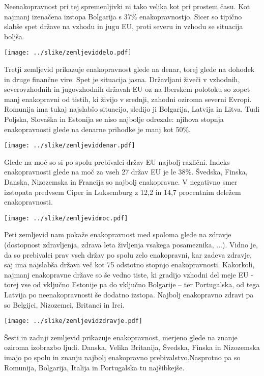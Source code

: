 \documentclass[11pt,a4paper]{article}
\begin{document}
Neenakopravnost pri tej spremenljivki ni tako velika kot pri prostem času. Kot najmanj izenačena izstopa Bolgarija s 37\% enakopravnostjo. Sicer so tipično slabše spet države na vzhodu in jugu EU, proti severu in vzhodu se situacija boljša.

\texttt{[image: ../slike/zemljeviddelo.pdf]}

\newpage

Tretji zemljevid prikazuje enakopravnost glede na denar, torej glede na dohodek in druge finančne vire. Spet je situacija jasna. Državljani živeči v vzhodnih, severovzhodnih in jugovzhodnih državah EU oz na Iberskem polotoku so zopet manj enakopravni od tistih, ki živijo v srednji, zahodni oziroma severni Evropi. Romunija ima tukaj najslabšo situacijo, sledijo ji Bolgarija, Latvija in Litva. Tudi Poljska, Slovaška in Estonija se niso najbolje odrezale: njihova stopnja enakopravnosti glede na denarne prihodke je manj kot 50\%.

\texttt{[image: ../slike/zemljeviddenar.pdf]}

\newpage

Glede na moč so si po spolu prebivalci držav EU najbolj različni. Indeks enakopravnosti glede na moč za vseh 27 držav EU je le 38\%. Švedska, Finska, Danska, Nizozemska in Francija so najbolj enakopravne. V negativno smer izstopata predvsem Ciper in Luksemburg z 12,2 in 14,7 procentnim deležem enakopravnosti.

\texttt{[image: ../slike/zemljevidmoc.pdf]}

\newpage

Peti zemljevid nam pokaže enakopravnost med spoloma glede na zdravje (dostopnost zdravljenja, zdrava leta življenja vsakega posameznika, ...). Vidno je, da so prebivalci prav vseh držav po spolu zelo enakopravni, kar zadeva zdravje, saj ima najslabša država več kot 75 odstotno stopnjo enakopravnosti. Kakorkoli, najmanj enakopravne države so še vedno tiste, ki gradijo vzhodni del meje EU - torej vse od vključno Estonije pa do vključno Bolgarije -- ter Portugalska, od tega Latvija po neenakopravnosti še dodatno izstopa. Najbolj enakopravno zdravi pa so Belgijci, Nizozemci, Britanci in Irci.

\texttt{[image: ../slike/zemljevidzdravje.pdf]}

\newpage

Šesti in zadnji zemljevid prikazuje enakopravnost, merjeno glede na znanje oziroma izobrazbo ljudi. Danska, Velika Britanija, Švedska, Finska in Nizozemska imajo po spolu in znanju najbolj enakopravno prebivalstvo.Nasprotno pa so Romunija, Bolgarija, Italija in Portugalska tu najšibkejše.
\end{document}
